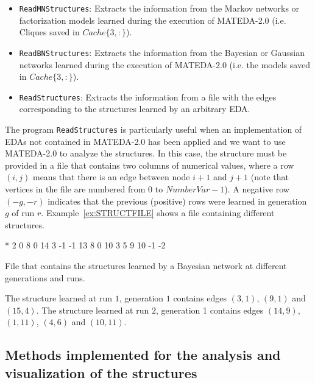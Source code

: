 \documentclass[a4paper]{article}
\begin{document}
\begin{itemize}
  \item \texttt{ReadMNStructures}:  Extracts the information from  the Markov networks or factorization models learned
  during the execution of MATEDA-2.0 (i.e. Cliques saved in $Cache\{3,:\}$).
  \item \texttt{ReadBNStructures}:  Extracts the information from  the Bayesian or Gaussian networks learned
  during the execution of MATEDA-2.0 (i.e. the models saved in $Cache\{3,:\}$).
  \item \texttt{ReadStructures}:  Extracts the information from  a file with the edges corresponding
  to the structures learned by an arbitrary EDA.
\end{itemize}

The program \texttt{ReadStructures} is particularly useful when an
implementation of EDAs not contained in MATEDA-2.0  has been applied
and we want to use MATEDA-2.0 to analyze the structures.  In this
case, the structure must be provided in a file that contains two columns of numerical
values, where a row $(i,j)$  means that there is an edge between node $i+1$ and $j+1$ (note that
vertices in the file are numbered from $0$ to $NumberVar-1$). A negative row  $(-g, -r)$
indicates that the previous (positive) rows were learned in generation $g$ of run $r$. Example~\ref{ex:STRUCTFILE} shows a file
containing different structures.

\begin{example}
 \begin{programf}*
             2  0
             8  0
             14 3
             -1 -1
             13 8
             0 10
             3 5
             9 10
            -1 -2 \end{programf}
File that contains the structures learned by a
 Bayesian network at different generations and runs.
 \label{ex:STRUCTFILE} \end{example}

 The structure learned at run $1$, generation $1$ contains edges
          $(3,1)$, $(9,1)$ and $(15,4)$.  The structure learned at run $2$,
          generation 1 contains edges  $(14,9)$, $(1,11)$, $(4,6)$ and $(10,11)$.

\subsection{Methods implemented for the analysis and visualization
of the structures}
\end{document}
